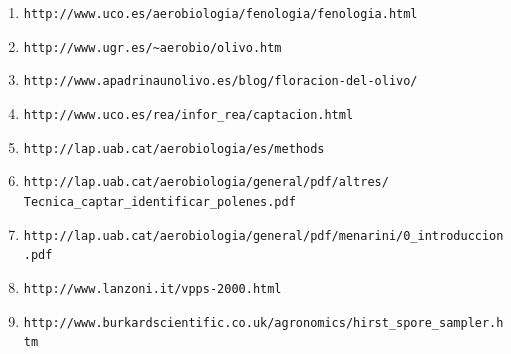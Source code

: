 \documentclass[12pt,oneside,a4paper]{article}
\numberwithin{figure}{section}
\begin{document}
\begin{enumerate}
\item \verb|http://www.uco.es/aerobiologia/fenologia/fenologia.html|

\item \verb|http://www.ugr.es/~aerobio/olivo.htm|

\item \verb|http://www.apadrinaunolivo.es/blog/floracion-del-olivo/|

\item \verb|http://www.uco.es/rea/infor_rea/captacion.html|

\item \verb|http://lap.uab.cat/aerobiologia/es/methods|

\item \verb|http://lap.uab.cat/aerobiologia/general/pdf/altres/|
\\ \verb|Tecnica_captar_identificar_polenes.pdf|

\item \verb|http://lap.uab.cat/aerobiologia/general/pdf/menarini/0_introduccion.pdf|

\item \verb|http://www.lanzoni.it/vpps-2000.html|

\item \verb|http://www.burkardscientific.co.uk/agronomics/hirst_spore_sampler.htm|



\end{enumerate}
\end{document}
